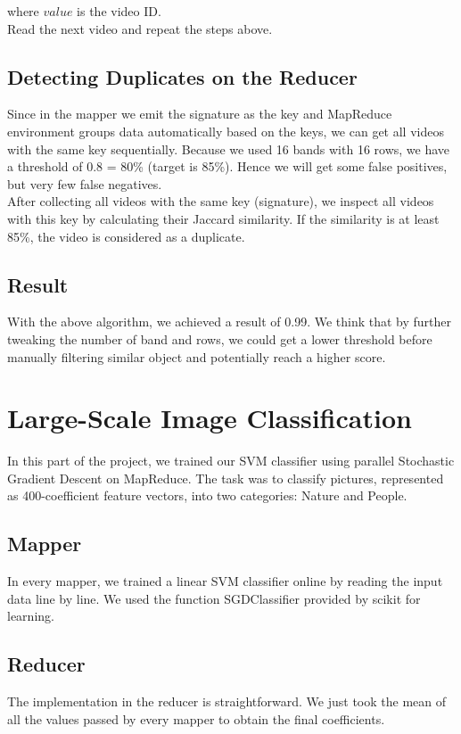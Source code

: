 \documentclass[a4paper, 11pt]{article}
\begin{document}
                where $value$ is the video ID.\\
                Read the next video and repeat the steps above.
                
        \subsection{Detecting Duplicates on the Reducer}
                Since in the mapper we emit the signature as the key and MapReduce environment groups data automatically based on the keys, we can get all videos with the same key sequentially. Because we used 16 bands with 16 rows, we have a threshold of 0.8 = 80\% (target is 85\%). Hence we will get some false positives, but very few false negatives.\\

                After collecting all videos with the same key (signature), we inspect all videos with this key by calculating their Jaccard similarity. If the similarity is at least 85\%, the video is considered as a duplicate.

        \subsection{Result}
                With the above algorithm, we achieved a result of 0.99. We think that by further tweaking the number of band and rows, we could get a lower threshold before manually filtering similar object and potentially reach a higher score.

\newpage

\section{Large-Scale Image Classification}

In this part of the project, we trained our SVM classifier using parallel Stochastic Gradient Descent on MapReduce. The task was to classify pictures, represented as 400-coefficient feature vectors, into two categories: Nature and People.

\subsection{Mapper}
In every mapper, we trained a linear SVM classifier online by reading the input data line by line. We used the function SGDClassifier provided by scikit for learning.

\subsection{Reducer}
The implementation in the reducer is straightforward. We just took the mean of all the values passed by every mapper to obtain the final coefficients.
\end{document}
